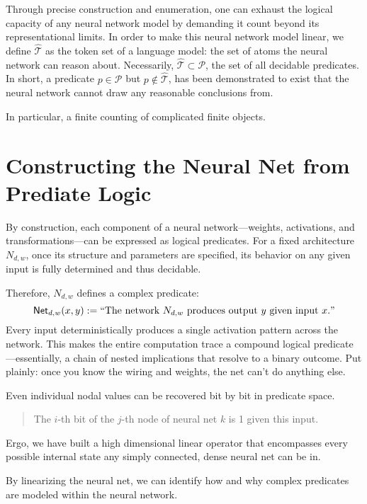 \documentclass[12pt]{article}
\theoremstyle{plain}
\begin{document}
Through precise construction and enumeration, one can exhaust the logical capacity
of any neural network model by demanding it count beyond its representational limits.
In order to make this neural network model linear, we define $\hat{\mathcal{T}}$ as 
the token set of a language model: the set of atoms the neural network can reason about. 
Necessarily,
$\hat{\mathcal{T}}\subset \mathcal{P}$, the set of all decidable predicates.  In short,
a predicate $p\in \mathcal{P}$ but $p \notin \hat{\mathcal{T}}$, has been
demonstrated to exist that the neural network cannot draw any reasonable conclusions from.

In particular, a finite counting of complicated finite objects.

\section{Constructing the Neural Net from Prediate Logic}

By construction, each component of a neural network---weights, 
activations, and transformations---can be expressed as logical 
predicates. For a fixed architecture $N_{d,w}$, once its 
structure and parameters are specified, its behavior on any 
given input is fully determined and thus decidable.

Therefore, $N_{d,w}$ defines a complex predicate:
$$
    \mathsf{Net}_{d,w}(x, y) := \text{``The network } N_{d,w} \text{ produces output } y \text{ given input } x." 
$$
Every input deterministically produces a single activation 
pattern across the network. This makes the entire computation 
trace a compound logical predicate---essentially, a chain of 
nested implications that resolve to a binary outcome. Put 
plainly: once you know the wiring and weights, the net can’t 
do anything else.

Even individual nodal values can be recovered bit by bit in
predicate space.
\begin{quote}
    The $i$-th bit of the $j$-th node of neural net $k$ is 1 given this input.
\end{quote}

Ergo, we have built a high dimensional linear operator that encompasses
every possible internal state any simply connected, dense neural net can be in.

By linearizing the neural net, we can identify how and why
complex predicates are modeled within the neural network.
\end{document}
